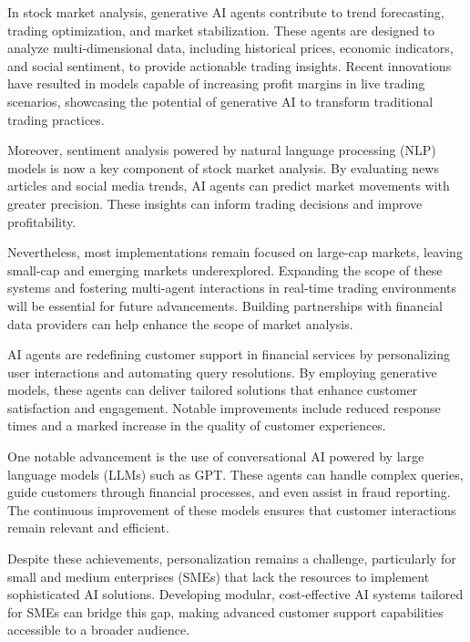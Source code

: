 \documentclass[a4paper,headinclude=on,footinclude=on,12pt,oneside]{scrbook}
\begin{document}
	
	In stock market analysis, generative AI agents contribute to trend forecasting, trading optimization, and market stabilization. These agents are designed to analyze multi-dimensional data, including historical prices, economic indicators, and social sentiment, to provide actionable trading insights. Recent innovations have resulted in models capable of increasing profit margins in live trading scenarios, showcasing the potential of generative AI to transform traditional trading practices.
	
	Moreover, sentiment analysis powered by natural language processing (NLP) models is now a key component of stock market analysis. By evaluating news articles and social media trends, AI agents can predict market movements with greater precision. These insights can inform trading decisions and improve profitability.
	
	Nevertheless, most implementations remain focused on large-cap markets, leaving small-cap and emerging markets underexplored. Expanding the scope of these systems and fostering multi-agent interactions in real-time trading environments will be essential for future advancements. Building partnerships with financial data providers can help enhance the scope of market analysis.
	
	
	AI agents are redefining customer support in financial services by personalizing user interactions and automating query resolutions. By employing generative models, these agents can deliver tailored solutions that enhance customer satisfaction and engagement. Notable improvements include reduced response times and a marked increase in the quality of customer experiences.
	
	One notable advancement is the use of conversational AI powered by large language models (LLMs) such as GPT. These agents can handle complex queries, guide customers through financial processes, and even assist in fraud reporting. The continuous improvement of these models ensures that customer interactions remain relevant and efficient.
	
	Despite these achievements, personalization remains a challenge, particularly for small and medium enterprises (SMEs) that lack the resources to implement sophisticated AI solutions. Developing modular, cost-effective AI systems tailored for SMEs can bridge this gap, making advanced customer support capabilities accessible to a broader audience.
	
\end{document}
